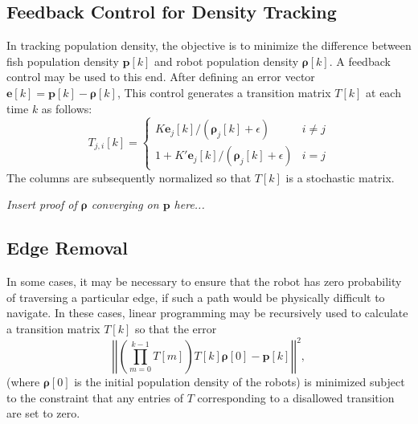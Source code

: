 \documentclass[11pt,letterpaper]{article}
\begin{document}
	\subsection{Feedback Control for Density Tracking}
	
	In tracking population density, the objective is to minimize the difference between fish population density $\mathbf p[k]$ and robot population density $\bm \rho[k]$. A feedback control may be used to this end. After defining an error vector $\mathbf e[k] = \mathbf p[k] - \bm \rho[k]$, This control generates a transition matrix $T[k]$ at each time $k$ as follows:
	\[
		T_{j, i}[k] = \left\{ \begin{array}{ll}
			K \mathbf e_j[k] / (\bm \rho_j[k] + \epsilon) & i \ne j \\
			1 + K' \mathbf e_j[k] / (\bm \rho_j[k] + \epsilon) & i = j
		\end{array} \right.
	\]
	The columns are subsequently normalized so that $T[k]$ is a stochastic matrix.
	\begin{center}
		\textit{Insert proof of $\bm \rho$ converging on $\mathbf p$ here...}
	\end{center}
	
	\subsection{Edge Removal}
	
	In some cases, it may be necessary to ensure that the robot has zero probability of traversing a particular edge, if such a path would be physically difficult to navigate. In these cases, linear programming may be recursively used to calculate a transition matrix $T[k]$ so that the error
	\[
		\left| \left|
			\left( \prod^{k - 1}_{m = 0} T[m] \right)T[k]\mathbf \rho[0] - \mathbf p[k]
		\right| \right|^2,
	\]
	(where $\bm \rho[0]$ is the initial population density of the robots) is minimized subject to the constraint that any entries of $T$ corresponding to a disallowed transition are set to zero.
	
	
\end{document}
